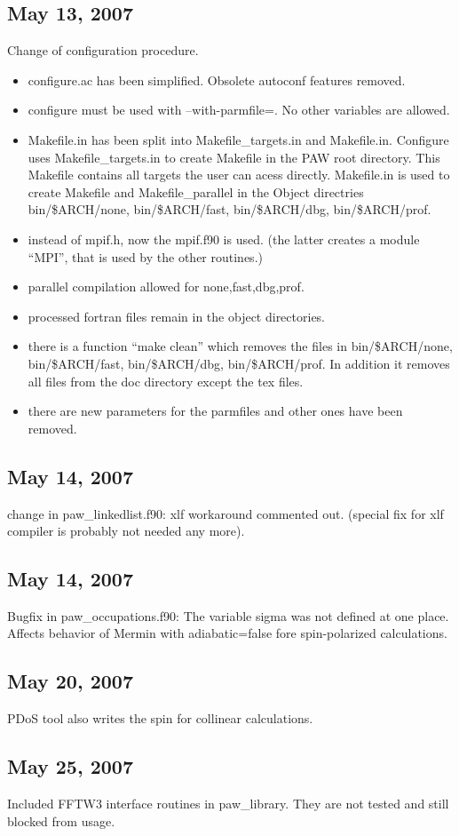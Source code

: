 \documentclass[final,12pt]{article}
\begin{document}
\subsection{May 13,  2007}

Change of configuration procedure.
\begin{itemize}
\item configure.ac has been simplified. Obsolete autoconf features removed.
\item configure must be used with --with-parmfile=. No other variables
  are allowed.
\item Makefile.in has been split into Makefile\_targets.in and
  Makefile.in. Configure uses Makefile\_targets.in to create Makefile
  in the PAW root directory. This Makefile contains all targets the
  user can acess directly. Makefile.in is used to create Makefile and
  Makefile\_parallel in the Object directries bin/\$ARCH/none,
  bin/\$ARCH/fast, bin/\$ARCH/dbg, bin/\$ARCH/prof.
\item instead of mpif.h, now the mpif.f90 is used. (the latter creates
  a module ``MPI'', that is used by the other routines.)
\item parallel compilation allowed for none,fast,dbg,prof.
\item processed fortran files remain in the object directories.
\item there is a function ``make clean'' which removes the files in
  bin/\$ARCH/none, bin/\$ARCH/fast, bin/\$ARCH/dbg, bin/\$ARCH/prof.
  In addition it removes all files from the doc directory except the
  tex files.
\item there are new parameters for the parmfiles and other ones have
  been removed.
\end{itemize}
   
\subsection{May 14,  2007}

change in paw\_linkedlist.f90: xlf workaround commented out. (special
fix for xlf compiler is probably not needed any more).

\subsection{May 14,  2007}

Bugfix in paw\_occupations.f90: The variable sigma was not defined at
one place. Affects behavior of Mermin with adiabatic=false fore
spin-polarized calculations.

\subsection{May 20,  2007}

PDoS tool also writes the spin for collinear calculations.

\subsection{May 25,  2007}

Included FFTW3 interface routines in paw_library. They are not tested
and still blocked from usage.


\newpage


\end{document}
